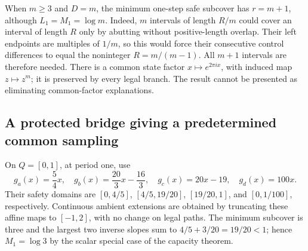 \documentclass[11pt,reqno]{amsart}
\numberwithin{equation}{section}
\theoremstyle{definition}
\begin{document}
When $m\ge3$ and $D=m$, the minimum one-step safe subcover has
$r=m+1$, although $L_1=M_1=\log m$. Indeed, $m$ intervals of
length $R/m$ could cover an interval of length $R$ only by abutting
without positive-length overlap. Their left endpoints are multiples
of $1/m$, so this would force their consecutive control differences
to equal the noninteger $R=m/(m-1)$. All $m+1$ intervals are
therefore needed. There is a common state factor
$x\mapsto e^{2\pi ix}$, with induced map $z\mapsto z^m$;
it is preserved by every legal branch. The result cannot be presented
as eliminating common-factor explanations.

\subsection{A protected bridge giving a predetermined common sampling}
On $Q=[0,1]$, at period one, use
\[
 g_a(x)=\frac54x,\quad g_b(x)=\frac{20}3x-\frac{16}3,
 \quad g_c(x)=20x-19,\quad g_d(x)=100x.
\]
Their safety domains are
$[0,4/5]$, $[4/5,19/20]$, $[19/20,1]$, and
$[0,1/100]$, respectively. Continuous ambient extensions are
obtained by truncating these affine maps to $[-1,2]$, with no
change on legal paths. The minimum subcover is three and the largest
two inverse slopes sum to $4/5+3/20=19/20<1$; hence
$M_1=\log3$ by the scalar special case of the capacity theorem.
\end{document}
